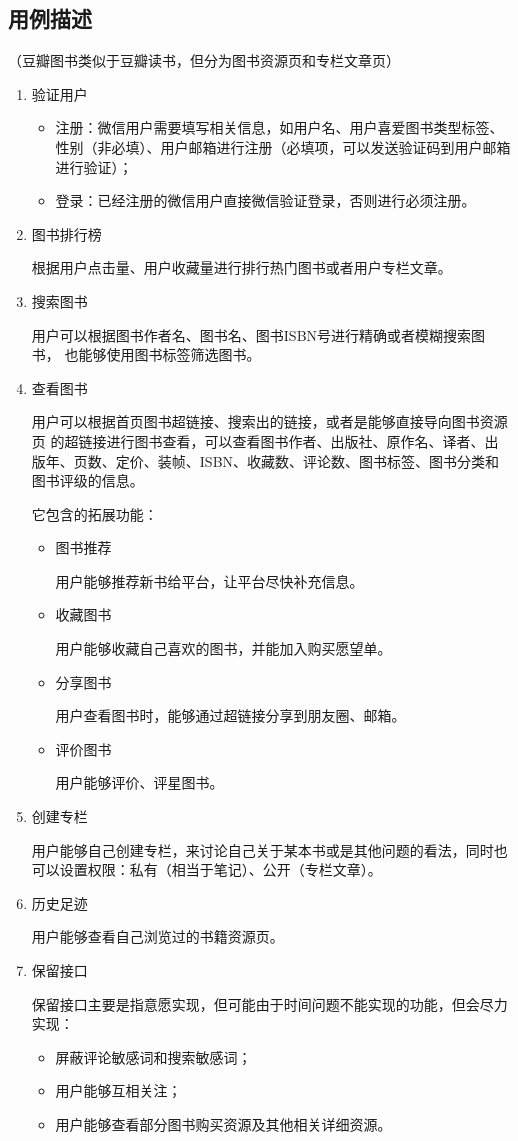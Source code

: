 \documentclass[a4paper,12pt]{ctexrep}
\begin{document}
	\subsection*{用例描述}
	（豆瓣图书类似于豆瓣读书，但分为图书资源页和专栏文章页）
	\begin{enumerate}
		\item 验证用户
		\begin{itemize}
			\item 注册：微信用户需要填写相关信息，如用户名、用户喜爱图书类型标签、性别（非必填）、用户邮箱进行注册（必填项，可以发送验证码到用户邮箱进行验证）；
			\item 登录：已经注册的微信用户直接微信验证登录，否则进行必须注册。
		\end{itemize}
		\item 图书排行榜
		\par 根据用户点击量、用户收藏量进行排行热门图书或者用户专栏文章。
		\item 搜索图书
		\par 用户可以根据图书作者名、图书名、图书ISBN号进行精确或者模糊搜索图书，
		也能够使用图书标签筛选图书。
		\item 查看图书
		\par 用户可以根据首页图书超链接、搜索出的链接，或者是能够直接导向图书资源页
		的超链接进行图书查看，可以查看图书作者、出版社、原作名、译者、出版年、页数、定价、装帧、ISBN、收藏数、评论数、图书标签、图书分类和图书评级的信息。
		\par 它包含的拓展功能：
		\begin{itemize}
			\item 图书推荐
			\par 用户能够推荐新书给平台，让平台尽快补充信息。
			\item 收藏图书
			\par 用户能够收藏自己喜欢的图书，并能加入购买愿望单。
			\item 分享图书
			\par 用户查看图书时，能够通过超链接分享到朋友圈、邮箱。
			\item 评价图书
			\par 用户能够评价、评星图书。
		\end{itemize}
		\item 创建专栏
		\par 用户能够自己创建专栏，来讨论自己关于某本书或是其他问题的看法，同时也可以设置权限：私有（相当于笔记）、公开（专栏文章）。
		\item 历史足迹
		\par 用户能够查看自己浏览过的书籍资源页。
		\item 保留接口
		\par 保留接口主要是指意愿实现，但可能由于时间问题不能实现的功能，但会尽力实现：
		\begin{itemize}
			\item 屏蔽评论敏感词和搜索敏感词；
			\item 用户能够互相关注；
			\item 用户能够查看部分图书购买资源及其他相关详细资源。
		\end{itemize}
	\end{enumerate}
\end{document}
